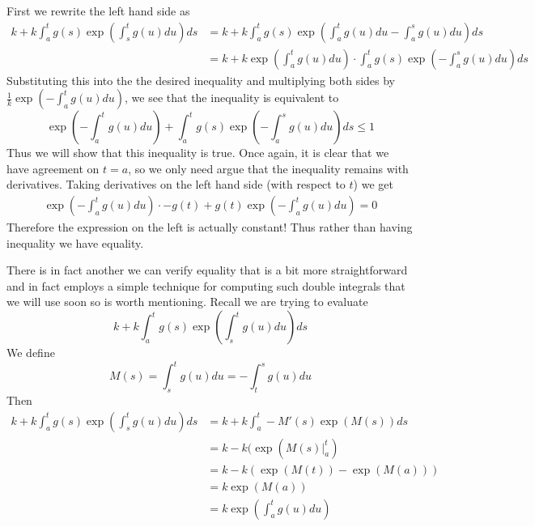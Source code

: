 First we rewrite the left hand side as
\begin{align*}
    k + k \int_{a}^{t} g(s) \exp \left( \int_s^t g(u) du \right) ds &= k + k \int_a^t g(s) \exp \left( \int_a^t g(u) du - \int_a^s g(u) du \right) ds\\
    &= k + k \exp \left( \int_a^t g(u) du \right) \cdot \int_a^t g(s) \exp \left( - \int_a^s g(u) du \right) ds
\end{align*}
Substituting this into the the desired inequality and multiplying both sides by $\frac{1}{k} \exp(- \int_a^t g(u) du)$, we see that the inequality is equivalent to
$$ \exp \left( -\int_a^t g(u) du \right) + \int_a^t g(s) \exp \left( - \int_a^s g(u) du \right) ds \leq 1 $$
Thus we will show that this inequality is true. Once again, it is clear that we have agreement on $t = a$, so we only need argue that the inequality remains with derivatives.
Taking derivatives on the left hand side (with respect to $t$) we get
\begin{align*}
    \exp \left( -\int_a^t g(u) du \right) \cdot -g(t) + g(t) \exp \left( -\int_a^t g(u) du \right) = 0
\end{align*}
Therefore the expression on the left is actually constant! Thus rather than having inequality we have equality. 

There is in fact another we can verify equality that is a bit more straightforward and in fact employs a simple technique for computing such double integrals that we will use soon so is worth mentioning. Recall we are trying to evaluate
$$ k + k \int_a^t g(s) \exp \left( \int_s^t g(u) du \right) ds $$
We define
$$ M(s) = \int_s^t g(u) du = - \int_t^s g(u) du $$
Then
\begin{align*}
    k + k \int_a^t g(s) \exp \left( \int_s^t g(u) du \right) ds &= k + k \int_a^t -M'(s) \exp(M(s)) ds\\
    &= k - k(\exp(M(s)|_a^t)\\
    &= k - k(\exp (M(t)) - \exp (M(a)))\\
    &= k \exp(M(a))\\
    &= k \exp \left( \int_a^t g(u) du \right)
\end{align*}

